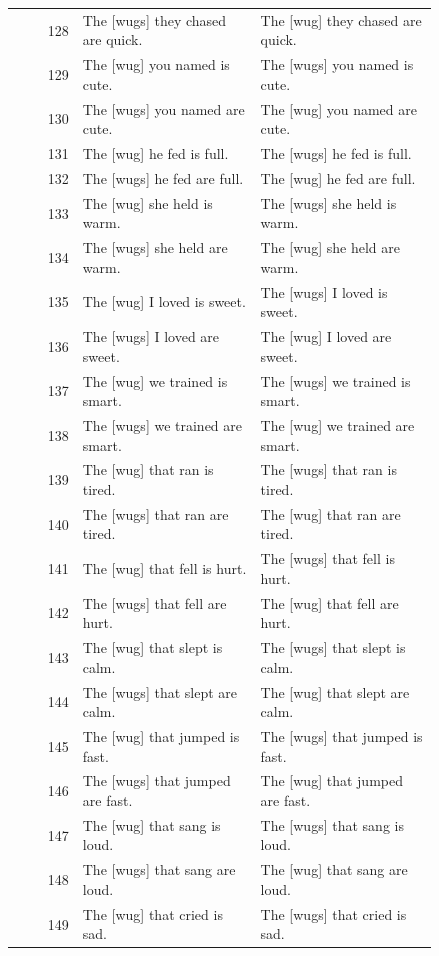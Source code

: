 \begin{longtable}{@{}rp{0.42\linewidth}p{0.42\linewidth}@{}}
128 & The {[}wugs{]} they chased are quick. & The {[}wug{]} they chased are quick. \\
129 & The {[}wug{]} you named is cute. & The {[}wugs{]} you named is cute. \\
130 & The {[}wugs{]} you named are cute. & The {[}wug{]} you named are cute. \\
131 & The {[}wug{]} he fed is full. & The {[}wugs{]} he fed is full. \\
132 & The {[}wugs{]} he fed are full. & The {[}wug{]} he fed are full. \\
133 & The {[}wug{]} she held is warm. & The {[}wugs{]} she held is warm. \\
134 & The {[}wugs{]} she held are warm. & The {[}wug{]} she held are warm. \\
135 & The {[}wug{]} I loved is sweet. & The {[}wugs{]} I loved is sweet. \\
136 & The {[}wugs{]} I loved are sweet. & The {[}wug{]} I loved are sweet. \\
137 & The {[}wug{]} we trained is smart. & The {[}wugs{]} we trained is smart. \\
138 & The {[}wugs{]} we trained are smart. & The {[}wug{]} we trained are smart. \\
139 & The {[}wug{]} that ran is tired. & The {[}wugs{]} that ran is tired. \\
140 & The {[}wugs{]} that ran are tired. & The {[}wug{]} that ran are tired. \\
141 & The {[}wug{]} that fell is hurt. & The {[}wugs{]} that fell is hurt. \\
142 & The {[}wugs{]} that fell are hurt. & The {[}wug{]} that fell are hurt. \\
143 & The {[}wug{]} that slept is calm. & The {[}wugs{]} that slept is calm. \\
144 & The {[}wugs{]} that slept are calm. & The {[}wug{]} that slept are calm. \\
145 & The {[}wug{]} that jumped is fast. & The {[}wugs{]} that jumped is fast. \\
146 & The {[}wugs{]} that jumped are fast. & The {[}wug{]} that jumped are fast. \\
147 & The {[}wug{]} that sang is loud. & The {[}wugs{]} that sang is loud. \\
148 & The {[}wugs{]} that sang are loud. & The {[}wug{]} that sang are loud. \\
149 & The {[}wug{]} that cried is sad. & The {[}wugs{]} that cried is sad. \\

\end{longtable}
